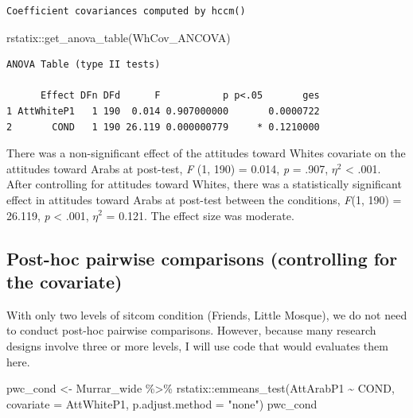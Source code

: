 \documentclass[
  11pt,
]{book}
\newenvironment{Shaded}{\begin{snugshade}}{\end{snugshade}}
\newcommand{\AttributeTok}[1]{\textcolor[rgb]{0.77,0.63,0.00}{#1}}
\newcommand{\FunctionTok}[1]{\textcolor[rgb]{0.00,0.00,0.00}{#1}}
\newcommand{\NormalTok}[1]{#1}
\newcommand{\OtherTok}[1]{\textcolor[rgb]{0.56,0.35,0.01}{#1}}
\newcommand{\SpecialCharTok}[1]{\textcolor[rgb]{0.00,0.00,0.00}{#1}}
\newcommand{\StringTok}[1]{\textcolor[rgb]{0.31,0.60,0.02}{#1}}
\begin{document}
\begin{verbatim}
Coefficient covariances computed by hccm()
\end{verbatim}

\begin{Shaded}
\begin{Highlighting}[]
\NormalTok{rstatix}\SpecialCharTok{::}\FunctionTok{get\_anova\_table}\NormalTok{(WhCov\_ANCOVA)}
\end{Highlighting}
\end{Shaded}

\begin{verbatim}
ANOVA Table (type II tests)

      Effect DFn DFd      F           p p<.05       ges
1 AttWhiteP1   1 190  0.014 0.907000000       0.0000722
2       COND   1 190 26.119 0.000000779     * 0.1210000
\end{verbatim}

There was a non-significant effect of the attitudes toward Whites covariate on the attitudes toward Arabs at post-test, \emph{F} (1, 190) = 0.014, \emph{p} = .907, \(\eta^2\) \textless{} .001. After controlling for attitudes toward Whites, there was a statistically significant effect in attitudes toward Arabs at post-test between the conditions, \emph{F}(1, 190) = 26.119, \emph{p} \textless{} .001, \(\eta^2\) = 0.121. The effect size was moderate.

\hypertarget{post-hoc-pairwise-comparisons-controlling-for-the-covariate-1}{%
\subsection{Post-hoc pairwise comparisons (controlling for the covariate)}\label{post-hoc-pairwise-comparisons-controlling-for-the-covariate-1}}

With only two levels of sitcom condition (Friends, Little Mosque), we do not need to conduct post-hoc pairwise comparisons. However, because many research designs involve three or more levels, I will use code that would evaluates them here.

\begin{Shaded}
\begin{Highlighting}[]
\NormalTok{pwc\_cond }\OtherTok{\textless{}{-}}\NormalTok{ Murrar\_wide }\SpecialCharTok{\%\textgreater{}\%}
\NormalTok{    rstatix}\SpecialCharTok{::}\FunctionTok{emmeans\_test}\NormalTok{(AttArabP1 }\SpecialCharTok{\textasciitilde{}}\NormalTok{ COND, }\AttributeTok{covariate =}\NormalTok{ AttWhiteP1, }\AttributeTok{p.adjust.method =} \StringTok{"none"}\NormalTok{)}
\NormalTok{pwc\_cond}
\end{Highlighting}
\end{Shaded}
\end{document}

